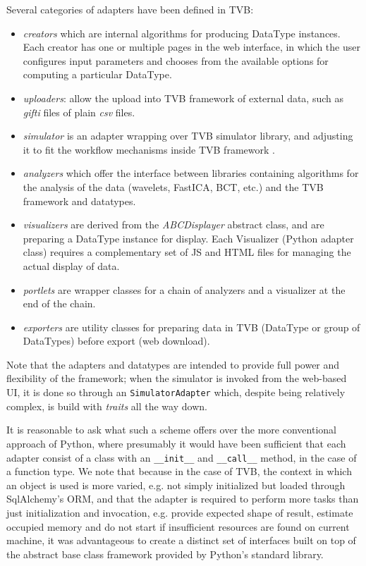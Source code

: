 Several categories of adapters have been defined in TVB: 

\begin{itemize}
	\item \textit{creators} which are internal algorithms for producing DataType instances. 
		Each creator has one or multiple pages in the web interface, in which the user
		 configures input parameters and chooses from the available options for computing a particular DataType.

	\item \textit{uploaders}: allow the upload into TVB framework of external data, 
    		such as \emph{gifti} files of plain \emph{csv} files.

	\item \textit{simulator} is an adapter wrapping over TVB simulator library, and adjusting it to fit
		the workflow mechanisms inside TVB framework .

	\item \textit{analyzers} which offer the interface between libraries containing algorithms 
		for the analysis of the data (wavelets, FastICA, BCT, etc.) and the TVB framework and datatypes.

	\item \textit{visualizers} are derived from the \emph{ABCDisplayer} abstract class, and are preparing  
		a DataType instance for display. Each Visualizer (Python adapter class) requires a complementary set
		of JS and HTML files for managing the actual display of data.

	\item \textit{portlets} are wrapper classes for a chain of analyzers and a visualizer at the end of the chain.

	\item \textit{exporters} are utility classes for preparing data in TVB (DataType or group of DataTypes)
		before export (web download).
\end{itemize}

Note that the adapters and datatypes are intended to provide full 
power and flexibility of the framework; when the simulator is invoked from
the web-based UI, it is done so through an \texttt{SimulatorAdapter} which,
despite being relatively complex, is build with \emph{traits} all the way down.

It is reasonable to ask what such a scheme offers over the more 
conventional approach of Python, where presumably it would have been
sufficient that each adapter consist of a class with an \texttt{\_\_init\_\_}
and \texttt{\_\_call\_\_} method, in the case of a function type. 
We note that because in the case of TVB, the context in which an object
is used is more varied, e.g. not simply initialized but loaded through 
SqlAlchemy's ORM, and that the adapter is required to perform more tasks
than just initialization and invocation, e.g. provide expected shape of 
result, estimate occupied memory and do not start if insufficient resources are found on current machine,
 it was advantageous to create a distinct set of interfaces built on top of
the abstract base class framework provided by Python's standard library.

